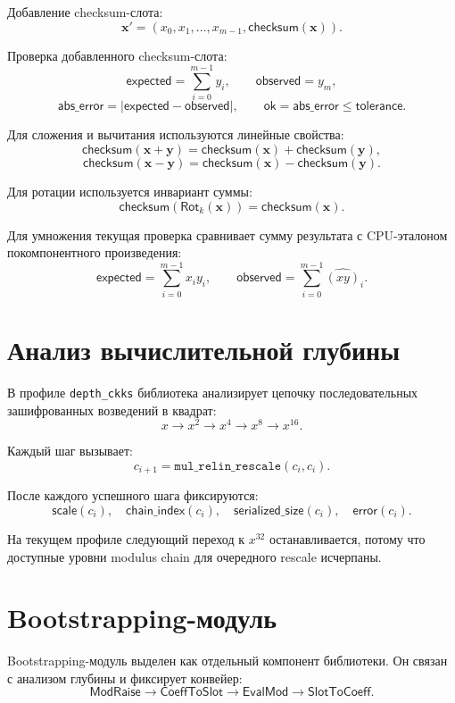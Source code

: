 \documentclass[12pt]{article}
\begin{document}
Добавление checksum-слота:
\[
    \mathbf{x}' =
    (x_0,x_1,\ldots,x_{m-1},\mathsf{checksum}(\mathbf{x})).
\]

Проверка добавленного checksum-слота:
\[
    \mathsf{expected} =
    \sum_{i=0}^{m-1} y_i,
    \qquad
    \mathsf{observed} = y_m,
\]
\[
    \mathsf{abs\_error}
    =
    |\mathsf{expected} - \mathsf{observed}|,
    \qquad
    \mathsf{ok}
    =
    \mathsf{abs\_error} \leq \mathsf{tolerance}.
\]

Для сложения и вычитания используются линейные свойства:
\[
    \mathsf{checksum}(\mathbf{x}+\mathbf{y})
    =
    \mathsf{checksum}(\mathbf{x})+
    \mathsf{checksum}(\mathbf{y}),
\]
\[
    \mathsf{checksum}(\mathbf{x}-\mathbf{y})
    =
    \mathsf{checksum}(\mathbf{x})-
    \mathsf{checksum}(\mathbf{y}).
\]

Для ротации используется инвариант суммы:
\[
    \mathsf{checksum}(\mathsf{Rot}_k(\mathbf{x}))
    =
    \mathsf{checksum}(\mathbf{x}).
\]

Для умножения текущая проверка сравнивает сумму результата
с CPU-эталоном покомпонентного произведения:
\[
    \mathsf{expected}
    =
    \sum_{i=0}^{m-1} x_i y_i,
    \qquad
    \mathsf{observed}
    =
    \sum_{i=0}^{m-1} \widehat{(xy)}_i.
\]

\section*{Анализ вычислительной глубины}

В профиле \texttt{depth\_ckks} библиотека анализирует цепочку
последовательных зашифрованных возведений в квадрат:
\[
    x \rightarrow x^2 \rightarrow x^4 \rightarrow x^8 \rightarrow x^{16}.
\]

Каждый шаг вызывает:
\[
    c_{i+1} =
    \texttt{mul\_relin\_rescale}(c_i,c_i).
\]

После каждого успешного шага фиксируются:
\[
    \mathsf{scale}(c_i),\quad
    \mathsf{chain\_index}(c_i),\quad
    \mathsf{serialized\_size}(c_i),\quad
    \mathsf{error}(c_i).
\]

На текущем профиле следующий переход к \(x^{32}\) останавливается,
потому что доступные уровни modulus chain для очередного rescale
исчерпаны.

\section*{Bootstrapping-модуль}

Bootstrapping-модуль выделен как отдельный компонент библиотеки.
Он связан с анализом глубины и фиксирует конвейер:
\[
    \mathsf{ModRaise}
    \rightarrow
    \mathsf{CoeffToSlot}
    \rightarrow
    \mathsf{EvalMod}
    \rightarrow
    \mathsf{SlotToCoeff}.
\]
\end{document}

